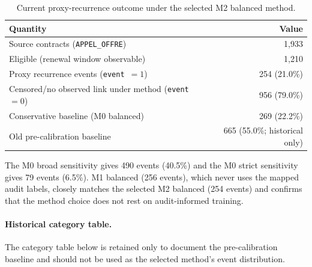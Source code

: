 \documentclass[11pt,a4paper]{article}
\begin{document}
\begin{table}[H]
\centering
\caption{Current proxy-recurrence outcome under the selected M2 balanced method.}
\label{tab:link}
\small
\begin{tabular}{@{}lr@{}}
\toprule
\textbf{Quantity} & \textbf{Value} \\
\midrule
Source contracts (\texttt{APPEL\_OFFRE}) & 1{,}933 \\
Eligible (renewal window observable) & 1{,}210 \\
Proxy recurrence events (\texttt{event}~$=1$) & 254 \quad(21.0\%) \\
Censored/no observed link under method (\texttt{event}~$=0$) & 956 \quad(79.0\%) \\
Conservative baseline (M0 balanced) & 269 \quad(22.2\%) \\
Old pre-calibration baseline & 665 \quad(55.0\%; historical only) \\
\bottomrule
\end{tabular}
\end{table}

The M0 broad sensitivity gives 490 events (40.5\%) and the M0 strict
sensitivity gives 79 events (6.5\%). M1 balanced (256 events), which never
uses the mapped audit labels, closely matches the selected M2 balanced (254
events) and confirms that the method choice does not rest on audit-informed
training.

\paragraph{Historical category table.}
The category table below is retained only to document the pre-calibration
baseline and should not be used as the selected method's event distribution.
\end{document}
